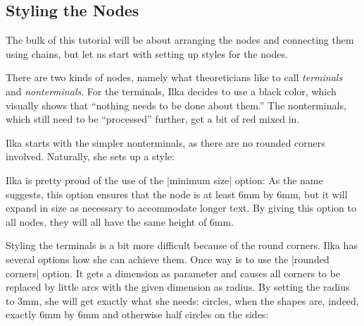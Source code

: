 \subsection{Styling the Nodes}

The bulk of this tutorial will be about arranging the nodes and
connecting them using chains, but let us start with setting up styles
for the nodes.

There are two kinds of nodes, namely what theoreticians like to call
\emph{terminals} and \emph{nonterminals}. For the terminals, Ilka
decides to use a black color, which visually shows that ``nothing
needs to be done about them.'' The nonterminals, which still need to
be ``processed'' further, get a bit of red mixed in.

Ilka starts with the simpler nonterminals, as there are no rounded
corners involved. Naturally, she sets up a style:

\begin{codeexample}[]
\end{codeexample}
Ilka is pretty proud of the use of the |minimum size| option: As the
name suggests, this option ensures that the node is at least 6mm by
6mm, but it will expand in size as necessary to accommodate longer
text. By giving this option to all nodes, they will all have the same
height of 6mm.

Styling the terminals is a bit more difficult because of the round
corners. Ilka has several options how she can achieve them. Once way
is to use the |rounded corners| option. It gets a dimension as
parameter and causes all corners to be replaced by little arcs with
the given dimension as radius. By setting the radius to 3mm, she will
get exactly what she needs: circles, when the shapes are, indeed,
exactly 6mm by 6mm and otherwise half circles on the sides:

